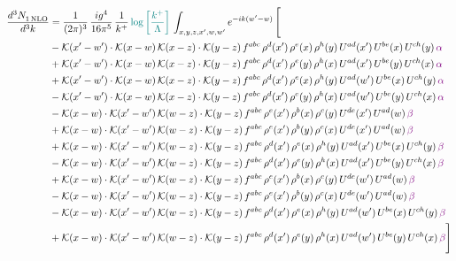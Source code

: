 \documentclass[9pt]{article}
\numberwithin{equation}{section}
\begin{document}
\begin{align}
  \frac{d^{3}N_{1\,\rm NLO}^{\rm}}{d^{3}k}  & = \frac{1}{(2\pi)^{3}}\, \frac{ig^{4}}{16\pi^{5}}\, \frac{1}{k^{+}}\, {\color{teal}\log{\left[\frac{k^{+}}{\Lambda}\right]}}\,\int_{x,y,z,x^{\prime},w,w^{\prime}}e^{-ik(w^{\prime}-w)}\, \Bigg[\notag \\ & -\mathcal{K}(x'-w')\cdot\mathcal{K}(x-w)\,\mathcal{K}(x-z)\cdot\mathcal{K}(y-z)\, f^{abc}\,\rho^{d}(x')\,\rho^{e}(x)\,\rho^{h}(y)\,U^{ad}(x')\,U^{be}(x)\,U^{ch}(y)\,{\color{violet}\alpha}\notag\\
&+\mathcal{K}(x'-w')\cdot\mathcal{K}(x-w)\,\mathcal{K}(x-z)\cdot\mathcal{K}(y-z)\, f^{abc}\,\rho^{d}(x')\,\rho^{e}(y)\,\rho^{h}(x)\,U^{ad}(x')\,U^{be}(y)\,U^{ch}(x)\,{\color{violet}\alpha}\notag\\ & +\mathcal{K}(x'-w')\cdot\mathcal{K}(x-w)\,\mathcal{K}(x-z)\cdot\mathcal{K}(y-z)\, f^{abc}\,\rho^{d}(x')\,\rho^{e}(x)\,\rho^{h}(y)\,U^{ad}(w')\,U^{be}(x)\,U^{ch}(y)\,{\color{violet}\alpha}\notag\\ & -\mathcal{K}(x'-w')\cdot\mathcal{K}(x-w)\,\mathcal{K}(x-z)\cdot\mathcal{K}(y-z)\, f^{abc}\,\rho^{d}(x')\,\rho^{e}(y)\,\rho^{h}(x)\,U^{ad}(w')\,U^{be}(y)\,U^{ch}(x)\,{\color{violet}\alpha}\notag\\ & - \mathcal{K}(x-w) \cdot \mathcal{K}(x'-w')\, \mathcal{K}(w-z)\cdot \mathcal{K}(y-z)\, f^{abc}\, \rho^{e}(x')\,\rho^{b}(x)\,\rho^{c}(y)\,U^{de}(x')\,U^{ad}(w)\,{\color{violet} \beta} \notag \\ &  +  \mathcal{K}(x-w) \cdot \mathcal{K}(x'-w')\, \mathcal{K}(w-z)\cdot \mathcal{K}(y-z)\, f^{abc}\, \rho^{e}(x')\,\rho^{b}(y)\,\rho^{c}(x)\,U^{de}(x')\,U^{ad}(w)\,{\color{violet} \beta} \notag \\ & + \mathcal{K}(x-w) \cdot \mathcal{K}(x'-w')\, \mathcal{K}(w-z)\cdot \mathcal{K}(y-z)\, f^{abc}\, \rho^{d}(x')\,\rho^{e}(x)\,\rho^{h}(y)\,U^{ad}(x')\,U^{be}(x)\,U^{ch}(y)\, {\color{violet} \beta} \notag \\ & - \mathcal{K}(x-w) \cdot \mathcal{K}(x'-w')\, \mathcal{K}(w-z)\cdot \mathcal{K}(y-z)\, f^{abc}\, \rho^{d}(x')\,\rho^{e}(y)\,\rho^{h}(x)\,U^{ad}(x')\,U^{be}(y)\,U^{ch}(x)\, {\color{violet} \beta} \notag \\ & + \mathcal{K}(x-w) \cdot \mathcal{K}(x'-w')\, \mathcal{K}(w-z)\cdot \mathcal{K}(y-z)\, f^{abc}\, \rho^{e}(x')\,\rho^{b}(x)\,\rho^{c}(y)\,U^{de}(w')\,U^{ad}(w)\,{\color{violet} \beta} \notag \\ & - \mathcal{K}(x-w) \cdot \mathcal{K}(x'-w')\, \mathcal{K}(w-z)\cdot \mathcal{K}(y-z)\, f^{abc}\, \rho^{e}(x')\,\rho^{b}(y)\,\rho^{c}(x)\,U^{de}(w')\,U^{ad}(w)\, {\color{violet} \beta} \notag \\ & - \mathcal{K}(x-w) \cdot \mathcal{K}(x'-w')\, \mathcal{K}(w-z)\cdot \mathcal{K}(y-z)\, f^{abc}\, \rho^{d}(x')\,\rho^{e}(x)\,\rho^{h}(y)\,U^{ad}(w')\,U^{be}(x)\,U^{ch}(y)\, {\color{violet} \beta} \notag \\ & + \mathcal{K}(x-w) \cdot \mathcal{K}(x'-w')\, \mathcal{K}(w-z)\cdot \mathcal{K}(y-z)\, f^{abc}\, \rho^{d}(x')\,\rho^{e}(y)\,\rho^{h}(x)\,U^{ad}(w')\,U^{be}(y)\,U^{ch}(x)\, {\color{violet} \beta} \Bigg]
\end{align}
\end{document}
